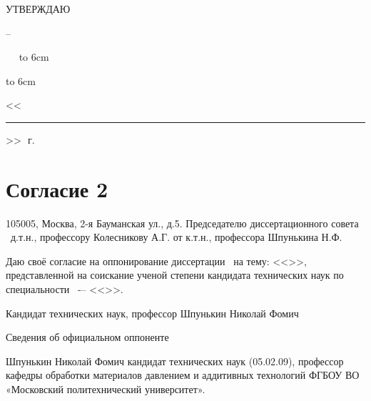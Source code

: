 
\hfill\parbox{6cm}{
	\centerline{УТВЕРЖДАЮ}
	\centerline{\leadingOrganizationHeadPos\---}
	\leadingOrganizationTitle
	
	\ktn~\leadingOrganizationHead\
	\linebreak
	{\hbox to 6cm{\hrulefill}}
	{\hbox to 6cm{<<\rule{7mm}{0.4pt}>>\hrulefill~\number\year\,г.}}}
\vspace{0.5cm}


\section{Согласие 2}



105005, Москва, 2-я Бауманская ул., д.5.
Председателю диссертационного совета \
д.т.н., профессору Колесникову А.Г.
от к.т.н., профессора Шпунькина Н.Ф.





Даю своё согласие на оппонирование диссертации \thesisAuthorLastNameFromFull\ на тему: <<\thesisTitle>>, представленной на соискание ученой степени кандидата технических наук по специальности \thesisSpecialtyNumber\ -– <<\thesisSpecialtyTitle>>.





Кандидат технических наук, профессор		Шпунькин Николай Фомич








Сведения об официальном оппоненте

Шпунькин Николай Фомич кандидат технических наук (05.02.09), профессор кафедры обработки материалов давлением и аддитивных технологий ФГБОУ ВО «Московский политехнический университет».

